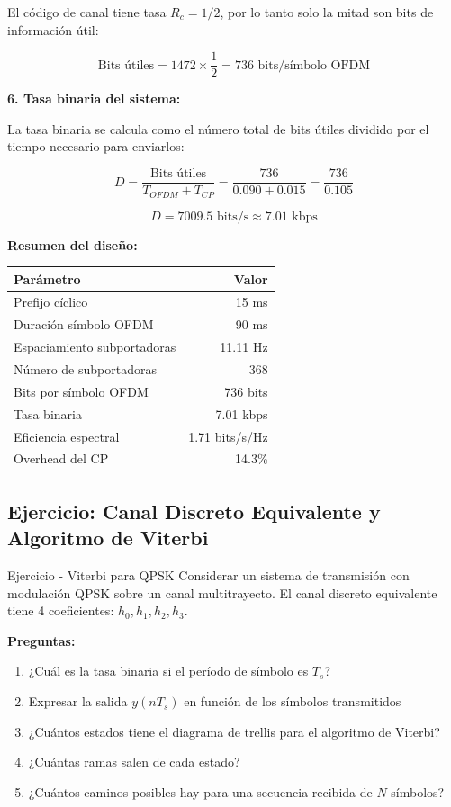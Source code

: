 \documentclass[10pt,a4paper]{article}
\begin{document}
\begin{solucion}
El código de canal tiene tasa $R_c = 1/2$, por lo tanto solo la mitad son bits de información útil:

\[
\boxed{\text{Bits útiles} = 1472 \times \frac{1}{2} = 736\text{ bits/símbolo OFDM}}
\]

\textbf{6. Tasa binaria del sistema:}

La tasa binaria se calcula como el número total de bits útiles dividido por el tiempo necesario para enviarlos:

\[
D = \frac{\text{Bits útiles}}{T_{OFDM} + T_{CP}} = \frac{736}{0.090 + 0.015} = \frac{736}{0.105}
\]

\[
\boxed{D = 7009.5\text{ bits/s} \approx 7.01\text{ kbps}}
\]

\textbf{Resumen del diseño:}

\begin{center}
\begin{tabular}{|l|r|}
\hline
\textbf{Parámetro} & \textbf{Valor} \\
\hline
Prefijo cíclico & 15 ms \\
Duración símbolo OFDM & 90 ms \\
Espaciamiento subportadoras & 11.11 Hz \\
Número de subportadoras & 368 \\
Bits por símbolo OFDM & 736 bits \\
Tasa binaria & 7.01 kbps \\
Eficiencia espectral & 1.71 bits/s/Hz \\
Overhead del CP & 14.3\% \\
\hline
\end{tabular}
\end{center}
\end{solucion}

\newpage
\subsection{Ejercicio: Canal Discreto Equivalente y Algoritmo de Viterbi}

\begin{ejercicio}{Ejercicio - Viterbi para QPSK}
Considerar un sistema de transmisión con modulación QPSK sobre un canal multitrayecto. El canal discreto equivalente tiene 4 coeficientes: $h_0, h_1, h_2, h_3$.

\textbf{Preguntas:}
\begin{enumerate}
\item ¿Cuál es la tasa binaria si el período de símbolo es $T_s$?
\item Expresar la salida $y(nT_s)$ en función de los símbolos transmitidos
\item ¿Cuántos estados tiene el diagrama de trellis para el algoritmo de Viterbi?
\item ¿Cuántas ramas salen de cada estado?
\item ¿Cuántos caminos posibles hay para una secuencia recibida de $N$ símbolos?
\end{enumerate}
\end{ejercicio}
\end{document}
